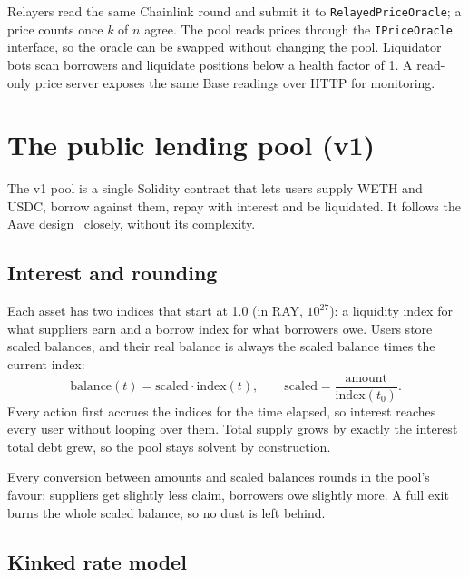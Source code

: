 \documentclass[11pt,a4paper]{article}
\newcommand{\code}[1]{\texttt{#1}}
\begin{document}
Relayers read the same Chainlink round and submit it to \code{RelayedPriceOracle}; a price counts once $k$ of
$n$ agree. The pool reads prices through the \code{IPriceOracle} interface, so the oracle can be swapped
without changing the pool. Liquidator bots scan borrowers and liquidate positions below a health factor of 1.
A read-only price server exposes the same Base readings over HTTP for monitoring.

\section{The public lending pool (v1)}

The v1 pool is a single Solidity contract that lets users supply WETH and USDC, borrow against them, repay with
interest and be liquidated. It follows the Aave design~\citep{aavev3} closely, without its complexity.

\subsection{Interest and rounding}

Each asset has two indices that start at 1.0 (in RAY, $10^{27}$): a liquidity index for what suppliers earn and
a borrow index for what borrowers owe. Users store scaled balances, and their real balance is always the scaled
balance times the current index:
\begin{equation}
  \text{balance}(t) = \text{scaled} \cdot \text{index}(t), \qquad
  \text{scaled} = \frac{\text{amount}}{\text{index}(t_0)} .
\end{equation}
Every action first accrues the indices for the time elapsed, so interest reaches every user without looping
over them. Total supply grows by exactly the interest total debt grew, so the pool stays solvent by
construction.

Every conversion between amounts and scaled balances rounds in the pool's favour: suppliers get slightly less
claim, borrowers owe slightly more. A full exit burns the whole scaled balance, so no dust is left behind.

\subsection{Kinked rate model}
\end{document}
